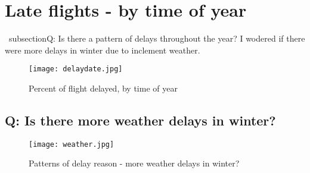 \documentclass[12pt]{article}
\begin{document}
	\section {Late flights - by time of year}
		\ subsection{Q: Is there a pattern of delays throughout the year?}
			I wodered if there were more delays in winter due to inclement weather.
		 	\begin{figure}[h!]
				\centering
				\texttt{[image: delaydate.jpg]}
				\caption{Percent of flight delayed, by time of year}
			\end{figure}
			\newpage
		\subsection{Q: Is there more weather delays in winter?}
		\begin{figure}[h!]
			\centering
			\texttt{[image: weather.jpg]}
			\caption{Patterns of delay reason - more weather delays in winter?}
		\end{figure}
\end{document}
